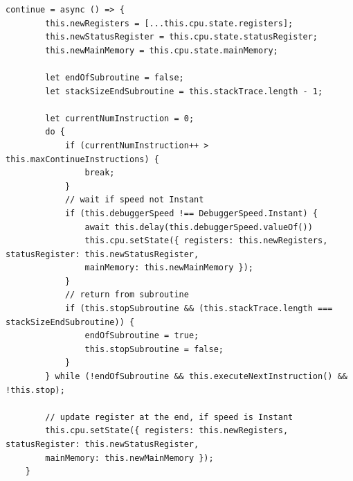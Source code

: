 \documentclass[a4paper, 11pt, onecolumn]{article}
\begin{document}
\begin{lstlisting}[style=JavaScript, basicstyle=\footnotesize, backgroundcolor=\color{backcolour}, caption={[Funktion $-$ Continue]Continue$-$Funktion der Code Execution Engine}, captionpos=b, label={lst:continue}]
continue = async () => {
        this.newRegisters = [...this.cpu.state.registers];
        this.newStatusRegister = this.cpu.state.statusRegister;
        this.newMainMemory = this.cpu.state.mainMemory;

        let endOfSubroutine = false;
        let stackSizeEndSubroutine = this.stackTrace.length - 1;

        let currentNumInstruction = 0;
        do {
            if (currentNumInstruction++ > this.maxContinueInstructions) {
                break;
            }
            // wait if speed not Instant
            if (this.debuggerSpeed !== DebuggerSpeed.Instant) {
                await this.delay(this.debuggerSpeed.valueOf())
                this.cpu.setState({ registers: this.newRegisters, statusRegister: this.newStatusRegister,
                mainMemory: this.newMainMemory });
            }
            // return from subroutine
            if (this.stopSubroutine && (this.stackTrace.length === stackSizeEndSubroutine)) {
                endOfSubroutine = true;
                this.stopSubroutine = false;
            }
        } while (!endOfSubroutine && this.executeNextInstruction() && !this.stop);

        // update register at the end, if speed is Instant
        this.cpu.setState({ registers: this.newRegisters, statusRegister: this.newStatusRegister,
        mainMemory: this.newMainMemory });
    }      	 
\end{lstlisting}

\noindent
\end{document}
